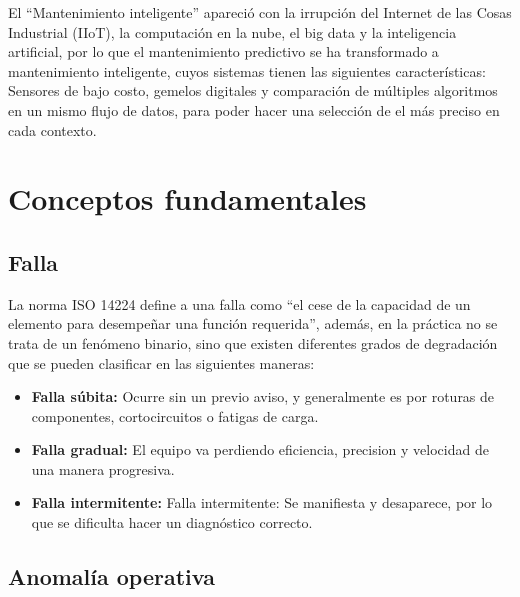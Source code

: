 
El ``Mantenimiento inteligente'' apareció con la irrupción del Internet de las Cosas Industrial (IIoT), la computación en la nube, el big data y la inteligencia 
artificial, por lo que el mantenimiento predictivo se ha transformado a mantenimiento inteligente, cuyos sistemas tienen las siguientes características: 
Sensores de bajo costo, gemelos digitales y comparación de múltiples algoritmos en un mismo flujo de datos, para poder hacer una selección de el más preciso en 
cada contexto.

\section{Conceptos fundamentales}

\subsection{Falla}

La norma ISO 14224 \cite{iso14224} define a una falla como ``el cese de la capacidad de un elemento para desempeñar una función requerida'', además, en la práctica no se trata de un fenómeno binario, sino que existen diferentes grados de degradación  que se pueden clasificar en las siguientes maneras:

\begin{itemize}
    \item \textbf{Falla súbita:} Ocurre sin un previo aviso, y generalmente es por roturas de componentes, cortocircuitos o fatigas de carga.
    \item \textbf{Falla gradual:} El equipo va perdiendo eficiencia, precision y velocidad de una manera progresiva.
    \item \textbf{Falla intermitente:} Falla intermitente: Se manifiesta y desaparece, por lo que se dificulta hacer un diagnóstico correcto.
\end{itemize}

\subsection{Anomalía operativa}

